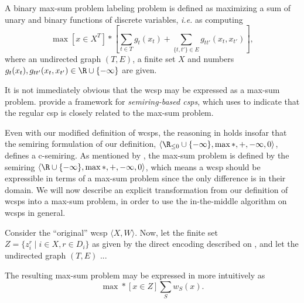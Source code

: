 \begin{definition}
	A binary max-sum problem labeling problem is defined as maximizing a sum of unary and binary functions of discrete variables, \emph{i.e.} as computing
	\begin{equation*}
		\max[x\in X^T]*\left[
			\sum_{t\in T}g_t(x_t) + \sum_{\{t,t'\}\in E}g_{tt'}(x_t,x_{t'})
		\right],
	\end{equation*}
	where an undirected graph \((T,E)\), a finite set \(X\) and numbers \(g_t(x_t), g_{tt'}(x_t,x_{t'}) \in \R\cup\{-\infty\}\) are given.
\end{definition}

It is not immediately obvious that the \gls{wcsp} may be expressed as a max-sum problem.
\Textcite{Bistarelli97} provide a framework for \emph{semiring-based \glspl{csp}}, which \textcite{Werner07} uses to indicate that the regular \gls{csp} is closely related to the max-sum problem.

Even with our modified definition of \glspl{wcsp}, the reasoning in \textcite[\pno~230]{Bistarelli97} holds insofar that the semiring formulation of our definition, \(\langle \Rminus\cup\{-\infty\}, \max*, +, -\infty, 0 \rangle\), defines a c-semiring.
As mentioned by \textcite[\pno~3]{Werner07}, the max-sum problem is defined by the semiring \(\langle \R\cup\{-\infty\}, \max*, +, -\infty, 0 \rangle\), which means a \gls{wcsp} should be expressible in terms of a max-sum problem since the only difference is in their domain.
We will now describe an explicit transformation from our definition of \glspl{wcsp} into a max-sum problem, in order to use the in-the-middle algorithm on \glspl{wcsp} in general.

Consider the \enquote{original} \gls{wcsp} \(\langle X, W \rangle\). Now, let the finite set \(Z = \{z_i^r \mid i\in X, r\in D_i\}\) as given by the direct encoding described on , and let the undirected graph \((T,E)\) ...

The resulting max-sum problem may be expressed in more intuitively as
\begin{equation*}
	\max*[x\in Z] \sum_{S} w_S(x).
\end{equation*}
